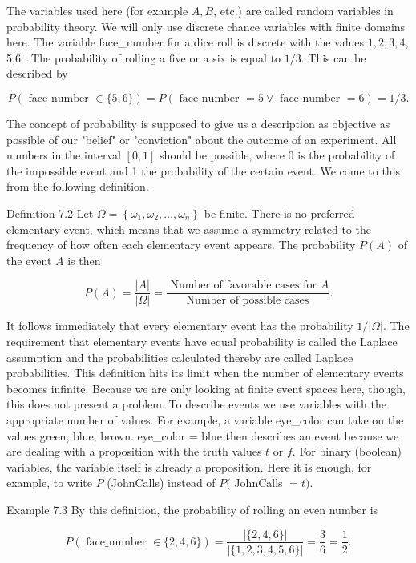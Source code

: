 \documentclass[10pt]{article}
\begin{document}
The variables used here (for example $A, B$, etc.) are called random variables in probability theory. We will only use discrete chance variables with finite domains here. The variable face\_number for a dice roll is discrete with the values $1,2,3,4$, 5,6 . The probability of rolling a five or a six is equal to $1 / 3$. This can be described by

$$
P(\text { face_number } \in\{5,6\})=P(\text { face_number }=5 \vee \text { face_number }=6)=1 / 3 .
$$

The concept of probability is supposed to give us a description as objective as possible of our "belief" or "conviction" about the outcome of an experiment. All numbers in the interval $[0,1]$ should be possible, where 0 is the probability of the impossible event and 1 the probability of the certain event. We come to this from the following definition.

Definition 7.2 Let $\Omega=\left\{\omega_{1}, \omega_{2}, \ldots, \omega_{n}\right\}$ be finite. There is no preferred elementary event, which means that we assume a symmetry related to the frequency of how often each elementary event appears. The probability $P(A)$ of the event $A$ is then

$$
P(A)=\frac{|A|}{|\Omega|}=\frac{\text { Number of favorable cases for } A}{\text { Number of possible cases }} .
$$

It follows immediately that every elementary event has the probability $1 /|\Omega|$. The requirement that elementary events have equal probability is called the Laplace assumption and the probabilities calculated thereby are called Laplace probabilities. This definition hits its limit when the number of elementary events becomes infinite. Because we are only looking at finite event spaces here, though, this does not present a problem. To describe events we use variables with the appropriate number of values. For example, a variable eye\_color can take on the values green, blue, brown. eye\_color = blue then describes an event because we are dealing with a proposition with the truth values $t$ or $f$. For binary (boolean) variables, the variable itself is already a proposition. Here it is enough, for example, to write $P$ (JohnCalls) instead of $P($ JohnCalls $=t)$.

Example 7.3 By this definition, the probability of rolling an even number is

$$
P(\text { face_number } \in\{2,4,6\})=\frac{|\{2,4,6\}|}{|\{1,2,3,4,5,6\}|}=\frac{3}{6}=\frac{1}{2} .
$$
\end{document}
